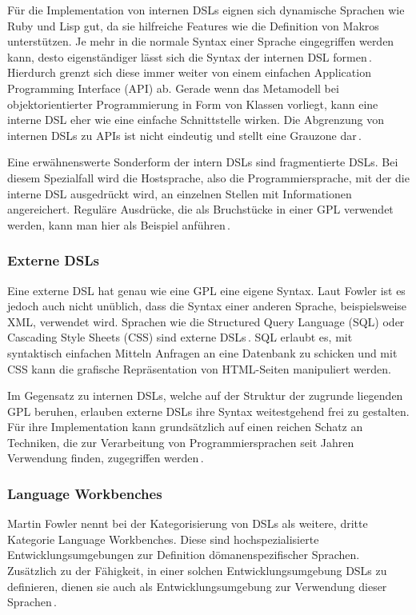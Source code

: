 \documentclass[12pt,oneside,a4paper,parskip]{scrbook}
\begin{document}
Für die Implementation von internen DSLs eignen sich dynamische Sprachen wie Ruby und Lisp gut, da sie hilfreiche Features wie die Definition von Makros unterstützen. Je mehr in die normale Syntax einer Sprache eingegriffen werden kann, desto eigenständiger lässt sich die Syntax der internen DSL formen\,\cite[S. 98]{stahl2007}. Hierdurch grenzt sich diese immer weiter von einem einfachen Application Programming Interface (API) ab. Gerade wenn das Metamodell bei objektorientierter Programmierung in Form von Klassen vorliegt, kann eine interne DSL eher wie eine einfache Schnittstelle wirken. Die Abgrenzung von internen DSLs zu APIs ist nicht eindeutig und stellt eine Grauzone dar\,\cite[S. 67]{fowler2010}.

Eine erwähnenswerte Sonderform der intern DSLs sind fragmentierte DSLs. Bei diesem Spezialfall wird die Hostsprache, also die Programmiersprache, mit der die interne DSL ausgedrückt wird, an einzelnen Stellen mit Informationen angereichert. Reguläre Ausdrücke, die als Bruchstücke in einer GPL verwendet werden, kann man hier als Beispiel anführen\,\cite[S. 32]{fowler2010}.

\subsubsection{Externe DSLs}

Eine externe DSL hat genau wie eine GPL eine eigene Syntax. Laut Fowler ist es jedoch auch nicht unüblich, dass die Syntax einer anderen Sprache, beispielsweise XML, verwendet wird. Sprachen wie die Structured Query Language (SQL) oder Cascading Style Sheets (CSS) sind externe DSLs\,\cite[S. 28]{fowler2010}. SQL erlaubt es, mit syntaktisch einfachen Mitteln Anfragen an eine Datenbank zu schicken und mit CSS kann die grafische Repräsentation von HTML-Seiten manipuliert werden.

Im Gegensatz zu internen DSLs, welche auf der Struktur der zugrunde liegenden GPL beruhen, erlauben externe DSLs ihre Syntax weitestgehend frei zu gestalten. Für ihre Implementation kann grundsätzlich auf einen reichen Schatz an Techniken, die zur Verarbeitung von Programmiersprachen seit Jahren Verwendung finden, zugegriffen werden\,\cite[S. 89]{fowler2010}.

\subsubsection{Language Workbenches}

Martin Fowler nennt bei der Kategorisierung von DSLs als weitere, dritte Kategorie Language Workbenches. Diese sind hochspezialisierte Entwicklungsumgebungen zur Definition dömanenspezifischer Sprachen. Zusätzlich zu der Fähigkeit, in einer solchen Entwicklungsumgebung DSLs zu definieren, dienen sie auch als Entwicklungsumgebung zur Verwendung dieser Sprachen\,\cite[S.28]{fowler2010}.
\end{document}
